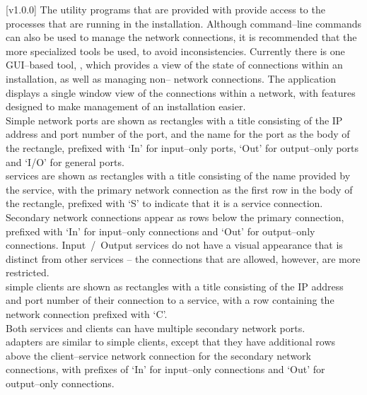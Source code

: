 [v1.0.0]
The utility programs that are provided with \mplusm{} provide access to the processes that
are running in the \mplusm{} installation.
Although command--line \yarp{} commands can also be used to manage the network
connections, it is recommended that the more specialized \mplusm{} tools be used, to avoid
inconsistencies.
Currently there is one GUI--based tool, ,
which provides a view of the state of connections within an \mplusm{} installation, as
well as managing non--\mplusm{} \yarp{} network connections.
The  application displays a single window
view of the connections within a \yarp{} network, with features designed to make
management of an \mplusm{} installation easier.\\

Simple \yarp{} network ports are shown as rectangles with a title consisting of the IP
address and port number of the port, and the \yarp{} name for the port as the body of the
rectangle, prefixed with `In' for input--only ports, `Out' for output--only ports and
`I/O' for general ports.\\

\mplusm{} services are shown as rectangles with a title consisting of the name provided by
the service, with the primary \yarp{} network connection as the first row in the body of
the rectangle, prefixed with `S' to indicate that it is a service connection.
Secondary \yarp{} network connections appear as rows below the primary connection,
prefixed with `In' for input--only connections and `Out' for output--only connections.
\mplusm{} Input~/~Output services do not have a visual appearance that is distinct from
other \mplusm{} services -- the connections that are allowed, however, are more
restricted.\\

\mplusm{} simple clients are shown as rectangles with a title consisting of the IP address
and port number of their connection to a service, with a row containing the \yarp{}
network connection prefixed with `C'.\\

Both \mplusm{} services and clients can have multiple secondary \yarp{} network ports.\\

\mplusm{} adapters are similar to \mplusm{} simple clients, except that they have
additional rows above the client--service \yarp{} network connection for the secondary
\yarp{} network connections, with prefixes of `In' for input--only connections and `Out'
for output--only connections.\\

